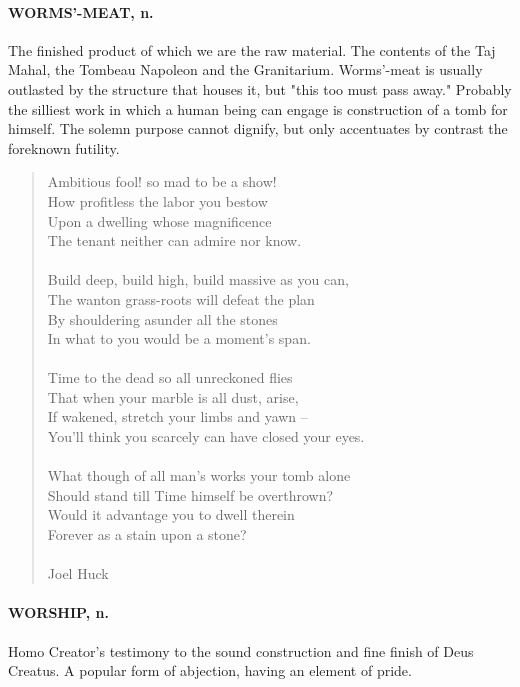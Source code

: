 \documentclass[11pt]{article}
\begin{document}
\paragraph{WORMS'-MEAT, n.}  The finished product of which we are the raw
material.  The contents of the Taj Mahal, the Tombeau Napoleon and the
Granitarium.  Worms'-meat is usually outlasted by the structure that
houses it, but "this too must pass away."  Probably the silliest work
in which a human being can engage is construction of a tomb for
himself.  The solemn purpose cannot dignify, but only accentuates by
contrast the foreknown futility.

\begin{quote}   Ambitious fool! so mad to be a show! \\
  How profitless the labor you bestow \\
      Upon a dwelling whose magnificence \\
  The tenant neither can admire nor know. \\
 \\
  Build deep, build high, build massive as you can, \\
  The wanton grass-roots will defeat the plan \\
      By shouldering asunder all the stones \\
  In what to you would be a moment's span. \\
 \\
  Time to the dead so all unreckoned flies \\
  That when your marble is all dust, arise, \\
      If wakened, stretch your limbs and yawn -- \\
  You'll think you scarcely can have closed your eyes. \\
 \\
  What though of all man's works your tomb alone \\
  Should stand till Time himself be overthrown? \\
      Would it advantage you to dwell therein \\
  Forever as a stain upon a stone? \\
 \\
Joel Huck \end{quote}


\paragraph{WORSHIP, n.}  Homo Creator's testimony to the sound construction and
fine finish of Deus Creatus.  A popular form of abjection, having an
element of pride.
\end{document}

